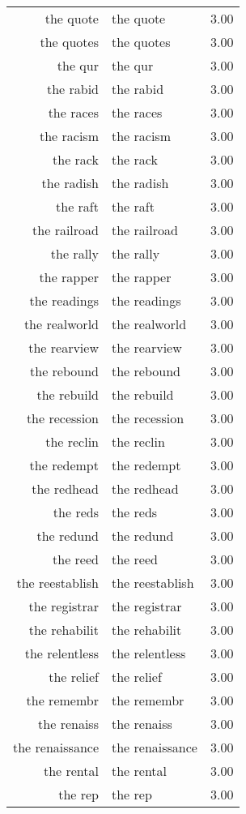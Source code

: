 \begin{table}[ht]
\begin{tabular}{rlr}
  the quote & the quote & 3.00 \\ 
  the quotes & the quotes & 3.00 \\ 
  the qur & the qur & 3.00 \\ 
  the rabid & the rabid & 3.00 \\ 
  the races & the races & 3.00 \\ 
  the racism & the racism & 3.00 \\ 
  the rack & the rack & 3.00 \\ 
  the radish & the radish & 3.00 \\ 
  the raft & the raft & 3.00 \\ 
  the railroad & the railroad & 3.00 \\ 
  the rally & the rally & 3.00 \\ 
  the rapper & the rapper & 3.00 \\ 
  the readings & the readings & 3.00 \\ 
  the realworld & the realworld & 3.00 \\ 
  the rearview & the rearview & 3.00 \\ 
  the rebound & the rebound & 3.00 \\ 
  the rebuild & the rebuild & 3.00 \\ 
  the recession & the recession & 3.00 \\ 
  the reclin & the reclin & 3.00 \\ 
  the redempt & the redempt & 3.00 \\ 
  the redhead & the redhead & 3.00 \\ 
  the reds & the reds & 3.00 \\ 
  the redund & the redund & 3.00 \\ 
  the reed & the reed & 3.00 \\ 
  the reestablish & the reestablish & 3.00 \\ 
  the registrar & the registrar & 3.00 \\ 
  the rehabilit & the rehabilit & 3.00 \\ 
  the relentless & the relentless & 3.00 \\ 
  the relief & the relief & 3.00 \\ 
  the remembr & the remembr & 3.00 \\ 
  the renaiss & the renaiss & 3.00 \\ 
  the renaissance & the renaissance & 3.00 \\ 
  the rental & the rental & 3.00 \\ 
  the rep & the rep & 3.00 \\ 

\end{tabular}
\end{table}

